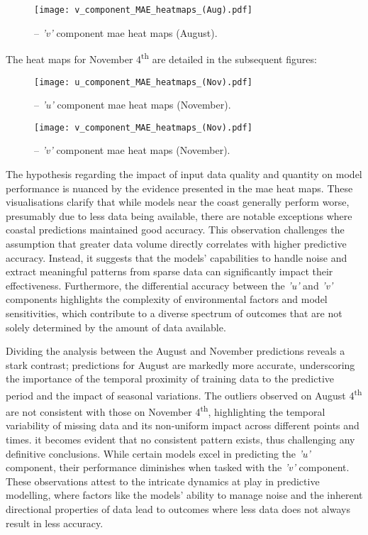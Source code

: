 \begin{figure}[htbp]
    \centering
    \texttt{[image: v\_component\_MAE\_heatmaps\_(Aug).pdf]}
    \caption[\textit{'v'} component MAE heat maps (August).]{-- \textit{'v'} component \acrshort{mae} heat maps (August).\label{fig_4.3}}
\end{figure}
The heat maps for November 4\textsuperscript{th} are detailed in the subsequent figures:

\begin{figure}[htbp]
    \centering
    \texttt{[image: u\_component\_MAE\_heatmaps\_(Nov).pdf]}
    \caption[\textit{'u'} component MAE heat maps (November).]{-- \textit{'u'} component \acrshort{mae} heat maps (November).\label{fig_4.4}}
\end{figure}

\begin{figure}[htbp]
    \centering
    \texttt{[image: v\_component\_MAE\_heatmaps\_(Nov).pdf]}
    \caption[\textit{'v'} component MAE heat maps (November).]{-- \textit{'v'} component \acrshort{mae} heat maps (November).\label{fig_4.5}}
\end{figure}

The hypothesis regarding the impact of input data quality and quantity on model performance is nuanced by the evidence presented in the \acrshort{mae} heat maps. These visualisations clarify that while models near the coast generally perform worse, presumably due to less data being available, there are notable exceptions where coastal predictions maintained good accuracy. This observation challenges the assumption that greater data volume directly correlates with higher predictive accuracy. Instead, it suggests that the models' capabilities to handle noise and extract meaningful patterns from sparse data can significantly impact their effectiveness. Furthermore, the differential accuracy between the \textit{'u'} and \textit{'v'} components highlights the complexity of environmental factors and model sensitivities, which contribute to a diverse spectrum of outcomes that are not solely determined by the amount of data available.

Dividing the analysis between the August and November predictions reveals a stark contrast; predictions for August are markedly more accurate, underscoring the importance of the temporal proximity of training data to the predictive period and the impact of seasonal variations. The outliers observed on August 4\textsuperscript{th} are not consistent with those on November 4\textsuperscript{th}, highlighting the temporal variability of missing data and its non-uniform impact across different points and times. it becomes evident that no consistent pattern exists, thus challenging any definitive conclusions. While certain models excel in predicting the \textit{'u'} component, their performance diminishes when tasked with the \textit{'v'} component. These observations attest to the intricate dynamics at play in predictive modelling, where factors like the models' ability to manage noise and the inherent directional properties of data lead to outcomes where less data does not always result in less accuracy.


